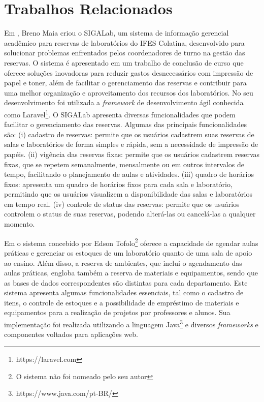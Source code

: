 \documentclass[12pt]{article}
\begin{document}
\section{Trabalhos Relacionados} \label{sec:trabalhos}

Em \cite{costa}, Breno Maia criou o SIGALab, um sistema de informação gerencial acadêmico para reservas de laboratórios do IFES Colatina, desenvolvido para solucionar problemas enfrentados pelos coordenadores de turno na gestão das reservas. O sistema é apresentado em um trabalho de conclusão de curso que oferece soluções inovadoras para reduzir gastos desnecessários com impressão de papel e toner, além de facilitar o gerenciamento das reservas e contribuir para uma melhor organização e aproveitamento dos recursos dos laboratórios. No seu desenvolvimento foi utilizada a \textit{framework} de desenvolvimento ágil conhecida como Laravel\footnote{ https://laravel.com}. O SIGALab apresenta diversas funcionalidades que podem facilitar o gerenciamento das reservas. Algumas das principais funcionalidades são: (i) cadastro de reservas: permite que os usuários cadastrem suas reservas de salas e laboratórios de forma simples e rápida, sem a necessidade de impressão de papéis. (ii) vigência das reservas fixas: permite que os usuários cadastrem reservas fixas, que se repetem semanalmente, mensalmente ou em outros intervalos de tempo, facilitando o planejamento de aulas e atividades. (iii) quadro de horários fixos: apresenta um quadro de horários fixos para cada sala e laboratório, permitindo que os usuários visualizem a disponibilidade das salas e laboratórios em tempo real. (iv) controle de status das reservas: permite que os usuários controlem o status de suas reservas, podendo alterá-las ou cancelá-las a qualquer momento. 

Em \cite{tofolo} o sistema concebido por Edson Tofolo\footnote{O sistema não foi nomeado pelo seu autor} oferece a capacidade de agendar aulas práticas e gerenciar os estoques de um laboratório quanto de uma sala de apoio ao ensino. Além disso, a reserva de ambientes, que inclui o agendamento das aulas práticas, engloba também a reserva de materiais e equipamentos, sendo que as bases de dados correspondentes são distintas para cada departamento. Este sistema apresenta algumas funcionalidades essenciais, tal como o cadastro de itens, o controle de estoques e a possibilidade de empréstimo de materiais e equipamentos para a realização de projetos por professores e alunos. Sua implementação foi realizada utilizando a linguagem Java\footnote{https://www.java.com/pt-BR/} e diversos \textit{frameworks} e componentes voltados para aplicações web.
\end{document}
